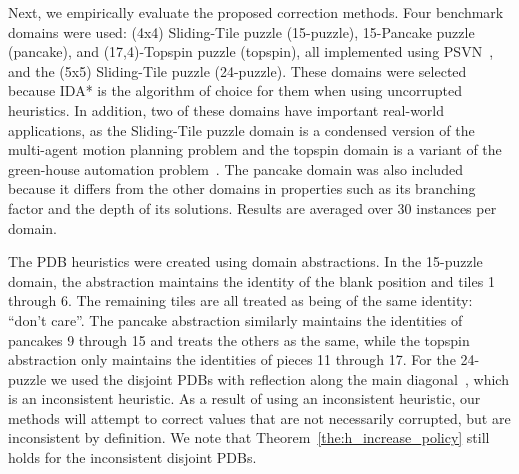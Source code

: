 \documentclass[letterpaper]{article}
\begin{document}
Next, we empirically evaluate the proposed correction methods. %
Four benchmark domains were used: (4x4) Sliding-Tile puzzle (15-puzzle), 15-Pancake puzzle (pancake), and (17,4)-Topspin puzzle (topspin), all implemented using PSVN~\cite{psvn}, and the (5x5) Sliding-Tile puzzle (24-puzzle). %
These domains were selected because IDA* is the algorithm of choice for them when using uncorrupted heuristics. In addition, two of these domains have important real-world applications, as the Sliding-Tile puzzle domain is a condensed version of the multi-agent motion planning problem and the topspin domain is a variant of the green-house automation problem~\cite{HelmertL10}. The pancake domain was also included because it differs from the other domains in properties such as its branching factor and the depth of its solutions. Results are averaged over 30 instances per domain.




The PDB heuristics were created using domain abstractions. In the 15-puzzle domain, the abstraction maintains the identity of the blank position and tiles 1 through 6. The remaining tiles are all treated as being of the same identity: ``don't care''. The pancake abstraction similarly maintains the identities of pancakes 9 through 15 and treats the others as the same, while the topspin abstraction only maintains the identities of pieces 11 through 17.
%
For the 24-puzzle we used the disjoint PDBs with reflection along the main diagonal~\cite{korf2002disjointPatternDatabase}, which is an inconsistent heuristic. As a result of using an inconsistent heuristic, our methods will attempt to correct values that are not necessarily corrupted, but are inconsistent by definition. We note that Theorem~\ref{the:h_increase_policy} still holds for the inconsistent disjoint PDBs.
\end{document}

